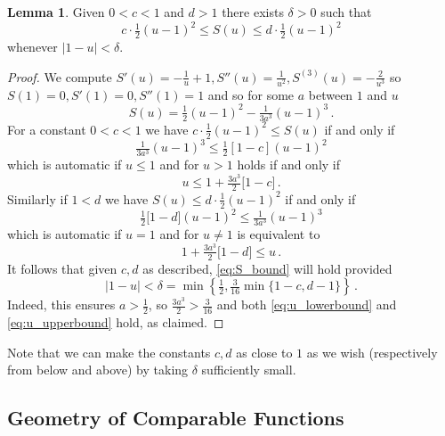 \documentclass[english,letter paper,12pt,reqno]{article}
\theoremstyle{definition}
\newtheorem{lemma}[theorem]{Lemma}
\def\be{\begin{equation}}
\def\ee{\end{equation}}
\begin{document}
\begin{lemma}\label{lemma:S_bounds} Given $0 < c < 1$ and $d > 1$ there exists $\delta > 0$ such that
\begin{equation}\label{eq:S_bound}
c \cdot \tfrac{1}{2}(u-1)^2 \le S(u) \le d \cdot \tfrac{1}{2} (u-1)^2
\end{equation}
whenever $|1 - u| < \delta$.
\end{lemma}
\begin{proof}
We compute $S'(u) = -\tfrac{1}{u} + 1, S''(u) = \tfrac{1}{u^2}, S^{(3)}(u) = -\tfrac{2}{u^3}$ so $S(1) = 0, S'(1) = 0, S''(1) = 1$ and so for some $a$ between $1$ and $u$
\[
S(u) = \tfrac{1}{2}(u-1)^2 - \tfrac{1}{3 a^3}(u-1)^3\,.
\]
For a constant $0 < c < 1$ we have $c \cdot \tfrac{1}{2}(u-1)^2 \le S(u)$ if and only if
\[
\tfrac{1}{3 a^3}(u-1)^3 \le \tfrac{1}{2}[1-c](u-1)^2
\]
which is automatic if $u \le 1$ and for $u > 1$ holds if and only if
\begin{equation}\label{eq:u_lowerbound}
u \le 1 + \tfrac{3a^3}{2}\big[1-c\big]\,.
\end{equation}
Similarly if $1 < d$ we have $S(u) \le d \cdot \tfrac{1}{2}(u-1)^2$ if and only if
\[
\tfrac{1}{2}\big[1 - d\big](u-1)^2 \le \tfrac{1}{3 a^3}(u-1)^3
\]
which is automatic if $u = 1$ and for $u \neq 1$ is equivalent to
\begin{equation}\label{eq:u_upperbound}
1 + \tfrac{3a^3}{2}\big[1 - d\big] \le u\,.
\end{equation}
It follows that given $c,d$ as described, \eqref{eq:S_bound} will hold provided
\be\label{eq:bound_delta}
|1 - u| < \delta = \min\left\{\tfrac{1}{2}, \tfrac{3}{16} \min\{1-c,d-1\}\right\}\,.
\ee
Indeed, this ensures $a > \tfrac{1}{2}$, so $\tfrac{3a^3}{2} > \tfrac{3}{16}$ and both \eqref{eq:u_lowerbound} and \eqref{eq:u_upperbound} hold, as claimed.
\end{proof}

Note that we can make the constants $c,d$ as close to $1$ as we wish (respectively from below and above) by taking $\delta$ sufficiently small.

\subsection{Geometry of Comparable Functions}\label{sec:geom_comparable}
\end{document}
